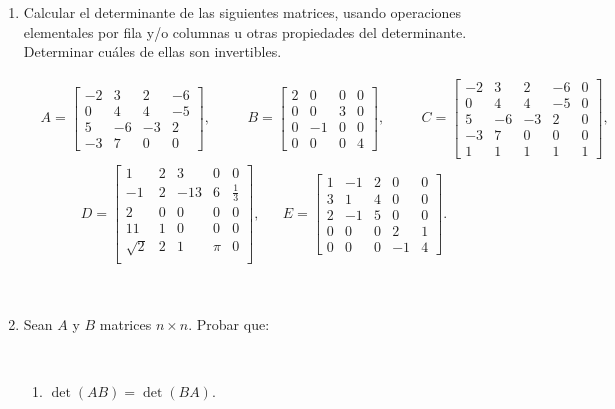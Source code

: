 \documentclass[12pt]{amsart}
\begin{document}
\begin{enumerate}
\

\item Calcular el determinante de las siguientes matrices, usando operaciones elementales por fila y/o columnas u otras propiedades del determinante. Determinar cu\'ales de ellas son invertibles.

\begin{align*}
&A=
\begin{bmatrix}
-2&3&2&-6\\ 0&4&4&-5\\ 5&-6&-3&2\\ -3&7&0&0 \end{bmatrix},\quad
&&B=\begin{bmatrix} 2&0&0&0\\ 0&0&3&0\\ 0&-1&0&0\\ 0&0&0&4\end{bmatrix},\quad
&&
C=\begin{bmatrix}
  -2&3&2&-6&0\\
0&4&4&-5&0\\
5&-6&-3&2&0\\
-3&7&0&0&0\\
1&1&1&1&1
  \end{bmatrix},
\end{align*}
\begin{align*}
D=\begin{bmatrix}
1&2&3&0&0\\
-1&2&-13&6&\frac{1}{3}\\
2&0&0&0&0\\
11&1&0&0&0\\
\sqrt{2}&2&1&\pi&0\\
\end{bmatrix},&&
E=\begin{bmatrix}
1&-1&2&0&0\\ 3&1&4&0&0\\ 2&-1&5&0&0 \\0&0&0&2&1\\ 0&0&0&-1&4
\end{bmatrix}.
\end{align*}


\

\item Sean $A$ y  $B$ matrices $n \times n$. Probar que:

\

\begin{enumerate}
	\item $\det(AB) = \det (BA)$.
	

\end{enumerate}
\end{enumerate}
\end{document}
